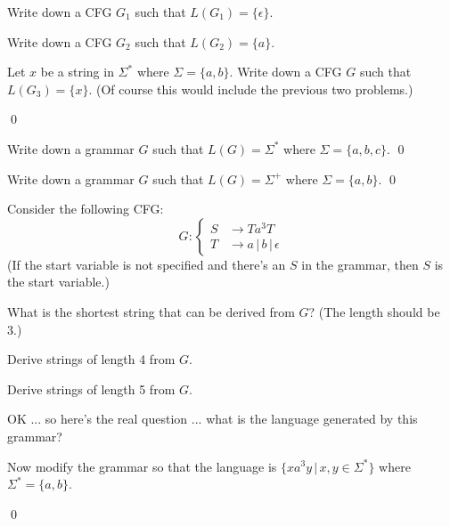 \newpage
\begin{ex}
\begin{tightlist}
\item Write down a CFG $G_1$ such that $L(G_1) = \{ \epsilon \}$.
\item Write down a CFG $G_2$ such that $L(G_2) = \{a\}$.
\item Let $x$ be a string in $\Sigma^*$
where $\Sigma = \{a, b\}$.
Write down a CFG $G$ such that $L(G_3) = \{x\}$.
(Of course this would include the previous two problems.)
\end{tightlist}
\qed
\end{ex}
\vspace{2in}


\begin{ex}
Write down a grammar $G$ such that $L(G) = \Sigma^*$ where 
$\Sigma = \{a, b, c\}$.
\qed
\end{ex}
\vspace{2in}


\begin{ex}
Write down a grammar $G$ such that $L(G) = \Sigma^+$ where 
$\Sigma = \{a, b\}$.
\qed
\end{ex}
\vspace{2in}



\begin{ex}
Consider the following CFG:
\[
G: 
\begin{cases}
S &\rightarrow Ta^3T \\
T &\rightarrow a \,|\, b \,|\, \epsilon 
\end{cases}
\]
(If the start variable is not specified and there's an $S$ in the grammar, 
then $S$ is the start variable.)
\begin{tightlist}
\item What is the shortest string that can be derived from $G$?
(The length should be 3.)
\item Derive strings of length 4 from $G$.
\item Derive strings of length 5 from $G$.
\item OK ... so here's the real question ... what is the language
generated by this grammar?
\item Now modify the grammar so that the language is
$\{xa^3y \,|\, x, y \in \Sigma^*\}$ where $\Sigma^* = \{a, b\}$.
\end{tightlist}
\qed
\end{ex}
\vspace{2in}




